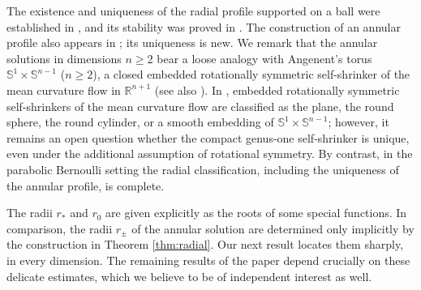 \documentclass[11pt]{article}
\numberwithin{equation}{section}
\theoremstyle{definition}
\newcommand{\RR}{\mathbb{R}}
\begin{document}
The existence and uniqueness of the radial profile supported on a ball were established in \cite[Proposition 1.1]{CV}, and its stability was proved in \cite[Section 4.2]{stability}. The construction of an annular profile also appears in \cite[Section 5]{radial}; its uniqueness is new. We remark that the annular solutions in dimensions $n\geq 2$ bear a loose analogy with Angenent's torus $\mathbb{S}^1\times \mathbb{S}^{n-1}$ ($n\geq 2$), a closed embedded rotationally symmetric self-shrinker of the mean curvature flow in $\RR^{n+1}$ \cite{Ang} (see also \cite{DN}). In \cite{KM}, embedded rotationally symmetric self-shrinkers of the mean curvature flow are classified as the plane, the round sphere, the round cylinder, or a smooth embedding of $\mathbb{S}^1\times \mathbb{S}^{n-1}$; however, it remains an open question whether the compact genus-one self-shrinker is unique, even under the additional assumption of rotational symmetry. By contrast, in the parabolic Bernoulli setting the radial classification, including the uniqueness of the annular profile, is complete.

The radii $r_*$ and $r_0$ are given explicitly as the roots of some special functions. In comparison, the radii $r_\pm$ of the annular solution are determined only implicitly by the construction in Theorem \ref{thm:radial}. Our next result locates them sharply, in every dimension. The remaining results of the paper depend crucially on these delicate estimates, which we believe to be of independent interest as well. 
\end{document}

